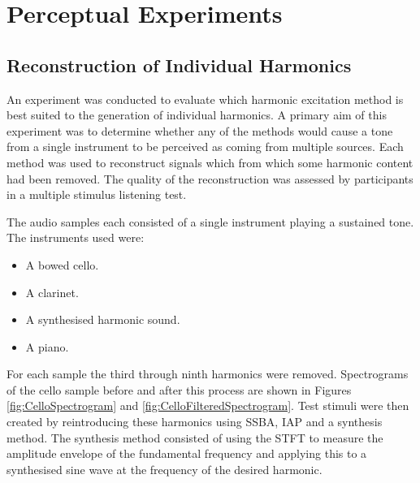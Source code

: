 \chapter{Perceptual Experiments}
\label{chap:PerceptualExperiments}

\section{Reconstruction of Individual Harmonics}
\label{sec:PerceptualExperiments-Reconstruction}
	An experiment was conducted to evaluate which harmonic excitation method is best suited to the generation of
	individual harmonics. A primary aim of this experiment was to determine whether any of the methods would cause a
	tone from a single instrument to be perceived as coming from multiple sources. Each method was used to reconstruct
	signals which from which some harmonic content had been removed. The quality of the reconstruction was assessed by
	participants in a multiple stimulus listening test. 

	The audio samples each consisted of a single instrument playing a sustained tone. The instruments used were:

	\begin{itemize}
		\item A bowed cello.
		\item A clarinet.
		\item A synthesised harmonic sound.
		\item A piano.
	\end{itemize}

	For each sample the third through ninth harmonics were removed. Spectrograms of the cello sample before and after
	this process are shown in Figures \ref{fig:CelloSpectrogram} and \ref{fig:CelloFilteredSpectrogram}.  Test stimuli
	were then created by reintroducing these harmonics using SSBA, IAP and a synthesis method.  The synthesis method
	consisted of using the STFT to measure the amplitude envelope of the fundamental frequency and applying this to a
	synthesised sine wave at the frequency of the desired harmonic. 

